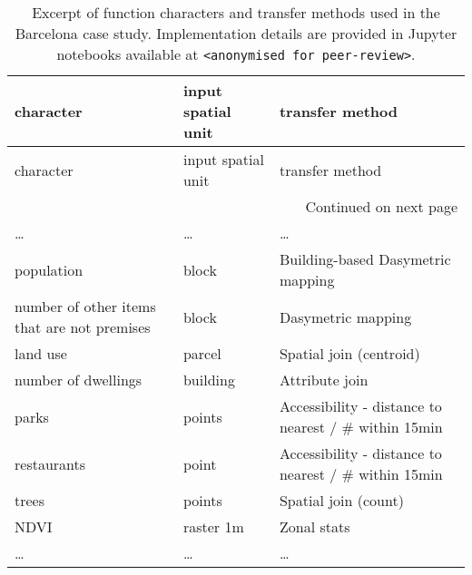 \begin{longtable}{p{5cm}p{3cm}p{5cm}}
\caption{Excerpt of function characters and transfer methods used in the Barcelona case study.
Implementation details are provided
in Jupyter notebooks available at \texttt{<anonymised for peer-review>}.}
\label{tab:bcn_fn_excerpt} \\
\toprule
                                        character & input spatial unit &                                    transfer method \\
\midrule
\endfirsthead

\toprule
                                        character & input spatial unit &                                    transfer method \\
\midrule
\endhead
\midrule
\multicolumn{3}{r}{{Continued on next page}} \\
\midrule
\endfoot

\bottomrule
\endlastfoot
\dots &                        \dots &                   \dots  \\

                                        population &              block &                  Building-based Dasymetric mapping \\
    number of other items that are not premises &              block &                                 Dasymetric mapping \\
                                        land use &             parcel &                            Spatial join (centroid) \\
                            number of dwellings &           building &                                     Attribute join \\
                                            parks &             points & Accessibility  - distance to nearest / \# within 15min \\
                                    restaurants &              point & Accessibility  - distance to nearest / \# within 15min \\
                                            trees &             points &                               Spatial join (count) \\
                                            NDVI &          raster 1m &                                        Zonal stats \\
                                            \dots &                        \dots &                   \dots  \\

\end{longtable}
\normalsize


